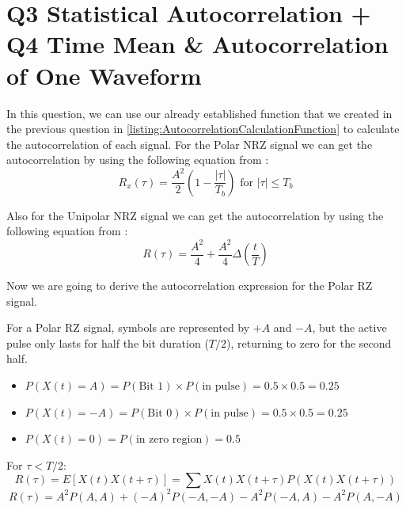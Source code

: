 \chapter[Q3 Statistical Autocorrelation + Q4 Time Mean \& Autocorrelation of One Waveform]{Q3 Statistical Autocorrelation + Q4 Time Mean \& Autocorrelation of One Waveform}
\label{cp:q3-statistical-autocorrelation}

In this question, we can use our already established function that we created
in the previous question in
\autoref{listing:AutocorrelationCalculationFunction} to calculate the
autocorrelation of each signal. For the Polar NRZ signal we can get the
autocorrelation by using the following equation from \cite{Khalid2026} :
\begin{equation}
    R_x(\tau) = \frac{A^2}{2} \left( 1 - \frac{|\tau|}{T_b} \right) \text{ for } |\tau| \leq T_b
    \label{eq:autocorrelation-polar-nrz}
\end{equation}

Also for the Unipolar NRZ signal we can get the autocorrelation by using the
following equation from \cite{Khalid2026} :
\begin{equation}
    R(\tau) = \frac{A^2}{4} + \frac{A^2}{4} \Delta\left(\frac{t}{T}\right)
    \label{eq:autocorrelation-unipolar}
\end{equation}

Now we are going to derive the autocorrelation expression for the Polar RZ
signal.

For a Polar RZ signal, symbols are represented by $+A$ and $-A$, but the active
pulse only lasts for half the bit duration ($T/2$), returning to zero for the
second half.
\begin{itemize}
    \item $P(X(t) = A) = P(\text{Bit 1}) \times P(\text{in pulse}) = 0.5 \times 0.5 = 0.25$
    \item $P(X(t) = -A) = P(\text{Bit 0}) \times P(\text{in pulse}) = 0.5 \times 0.5 = 0.25$
    \item $P(X(t) = 0) = P(\text{in zero region}) = 0.5$
\end{itemize}

For $\tau < T/2$:
\begin{equation}
    R(\tau) = E[X(t)X(t+\tau)] = \sum X(t)X(t+\tau) P(X(t)X(t+\tau))
\end{equation}
\begin{equation}
    R(\tau) = A^2 P(A,A) + (-A)^2 P(-A,-A) - A^2 P(-A,A) - A^2 P(A,-A)
\end{equation}


